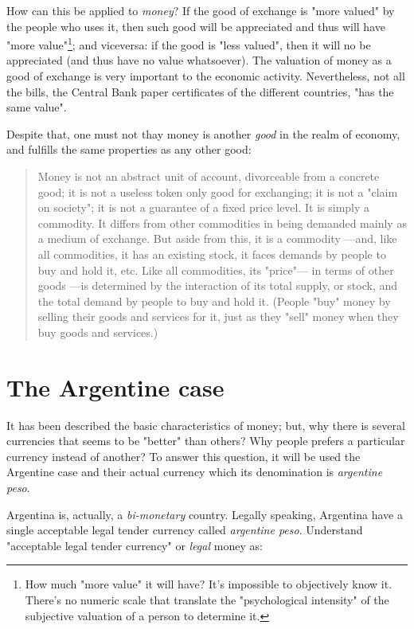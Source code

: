 \documentclass[12pt,a4paper,twoside]{book}
\begin{document}
How can this be applied to \textit{money}? If the good of exchange is "more valued" by the people who uses it, then such good will be appreciated and thus will have "more value"\footnote{How much "more value" it will have? It's impossible to objectively know it. There's no numeric scale that translate the "psychological intensity" of the subjective valuation of a person to determine it.}; and viceversa: if the good is "less valued", then it will no be appreciated (and thus have no value whatsoever). The valuation of money as a good of exchange is very important to the economic activity. Nevertheless, not all the bills, the Central Bank paper certificates of the different countries, "has the same value".

Despite that, one must not thay money is another \textit{good} in the realm of economy, and fulfills the same properties as any other good:

\begin{quotation}
Money is not an abstract unit of account, divorceable from a concrete good; it is not a useless token only good for exchanging; it is not a "claim on society"; it is not a guarantee of a fixed price level. It is simply a commodity. It differs from other commodities in being demanded mainly as a medium of exchange. But aside from this, it is a commodity —and, like all commodities, it has an existing stock, it faces demands by people to buy and hold it, etc. Like all commodities, its "price"— in terms of other goods —is determined by the interaction of its total supply, or stock, and the total demand by people to buy and hold it. (People "buy" money by selling their goods and services for it, just as they "sell" money when they buy goods and services.) \cite[pp. 9-10]{rothbard:money}
\end{quotation}

\chapter{The Argentine case}
It has been described the basic characteristics of money; but, why there is several currencies that seems to be "better" than others? Why people prefers a particular currency instead of another? To answer this question, it will be used the Argentine case and their actual currency which its denomination is \textit{argentine peso}.

Argentina is, actually, a \textit{bi-monetary} country. Legally speaking, Argentina have a single acceptable legal tender currency called \textit{argentine peso}. Understand "acceptable legal tender currency" or \textit{legal} money as:
\end{document}
